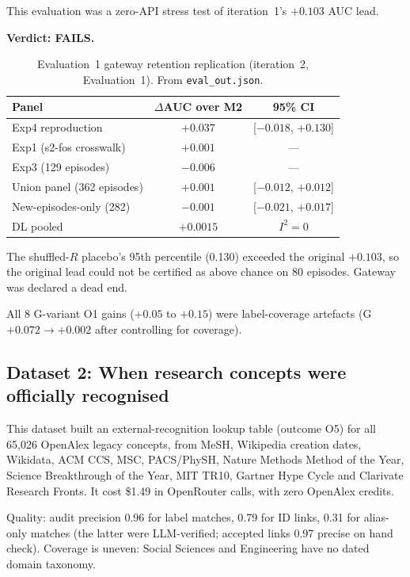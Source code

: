 \documentclass[11pt,letterpaper]{article}
\begin{document}
This evaluation was a zero-API stress test of iteration~1's $+0.103$ AUC lead.

\textbf{Verdict: FAILS.}

\begin{table}[!htbp]
\centering
\caption{Evaluation~1 gateway retention replication (iteration~2, Evaluation~1). From \texttt{eval\_out.json}.}
\label{tab:eval1_gateway}
\small
\begin{tabular}{p{5cm}cc}
\toprule
Panel & $\Delta$AUC over M2 & 95\% CI \\
\midrule
Exp4 reproduction & $+0.037$ & [$-0.018$, $+0.130$] \\
Exp1 (s2-fos crosswalk) & $+0.001$ & --- \\
Exp3 (129 episodes) & $-0.006$ & --- \\
Union panel (362 episodes) & $+0.001$ & [$-0.012$, $+0.012$] \\
New-episodes-only (282) & $-0.001$ & [$-0.021$, $+0.017$] \\
DL pooled & $+0.0015$ & $I^2 = 0$ \\
\bottomrule
\end{tabular}
\end{table}

The shuffled-$R$ placebo's 95th percentile (0.130) exceeded the original $+0.103$, so the original lead could not be certified as above chance on 80 episodes. Gateway was declared a dead end.

All 8 G-variant O1 gains ($+0.05$ to $+0.15$) were label-coverage artefacts (G $+0.072 \to +0.002$ after controlling for coverage).

\subsection{Dataset 2: When research concepts were officially recognised}

This dataset built an external-recognition lookup table (outcome O5) for all 65{,}026 OpenAlex legacy concepts, from MeSH, Wikipedia creation dates, Wikidata, ACM CCS, MSC, PACS/PhySH, Nature Methods Method of the Year, Science Breakthrough of the Year, MIT TR10, Gartner Hype Cycle and Clarivate Research Fronts. It cost \$1.49 in OpenRouter calls, with zero OpenAlex credits.

Quality: audit precision 0.96 for label matches, 0.79 for ID links, 0.31 for alias-only matches (the latter were LLM-verified; accepted links 0.97 precise on hand check). Coverage is uneven: Social Sciences and Engineering have no dated domain taxonomy.
\end{document}
